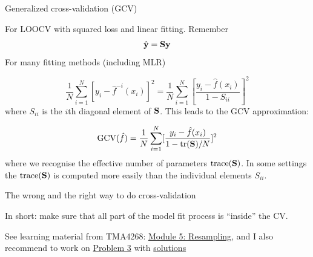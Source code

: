 \documentclass[
  ignorenonframetext,
]{beamer}
\begin{document}
\begin{frame}

\begin{block}{Generalized cross-validation (GCV)}

For LOOCV with squared loss and linear fitting. Remember
\[ \hat{\bf y}={\bf Sy}\] For many fitting methods (including MLR)

\[ \frac{1}{N}\sum_{i=1}^N [y_i-\hat{f}^{-i}(x_i)]^2=\frac{1}{N}\sum_{i=1}^N [\frac{y_i-\hat{f}(x_i)}{1-S_{ii}}]^2\]
where \(S_{ii}\) is the \(i\)th diagonal element of \({\bf S}\). This
leads to the GCV approximation:

\[ \text{GCV}(\hat{f})=\frac{1}{N}\sum_{i=1}^N [\frac{y_i-\hat{f}(x_i)}{1-\text{tr}({\bf S})/N}]^2\]
where we recognise the effective number of parameters
\(\text{trace}({\bf S})\). In some settings the
\(\text{trace}({\bf S})\) is computed more easily than the individual
elements \(S_{ii}\).

\end{block}

\end{frame}

\begin{frame}

\begin{block}{The wrong and the right way to do cross-validation}

In short: make sure that all part of the model fit process is ``inside''
the CV.

See learning material from TMA4268:
\href{https://www.math.ntnu.no/emner/TMA4268/2019v/5Resample/5Resample.html\#the_right_and_the_wrong_way_to_do_cross-validation}{Module
5: Resampling}, and I also recommend to work on
\href{https://www.math.ntnu.no/emner/TMA4268/2019v/5Resample/5Resample.html\#problem_3:_selection_bias_and_the_\%E2\%80\%9Cwrong_way_to_do_cv\%E2\%80\%9D}{Problem
3} with \href{}{solutions}

\end{block}

\end{frame}
\end{document}
